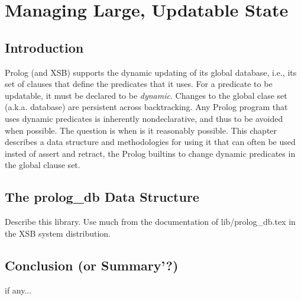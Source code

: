 \chapter{Managing Large, Updatable State}

\section{Introduction}
Prolog (and XSB) supports the dynamic updating of its global database,
i.e., its set of clauses that define the predicates that it uses.  For
a predicate to be updatable, it must be declared to be {\em dynamic}.
Changes to the global clase set (a.k.a. database) are persistent
across backtracking.  Any Prolog program that uses dynamic predicates
is inherently nondeclarative, and thus to be avoided when possible.
The question is when is it reasonably possible.  This chapter
describes a data structure and methodologies for using it that can
often be used insted of assert and retract, the Prolog builtins to
change dynamic predicates in the global clause set.

\section{The prolog\_db Data Structure}

Describe this library.  Use much from the documentation of
lib/prolog\_db.tex in the XSB system distribution.

\section{Conclusion (or Summary'?)}
if any...
